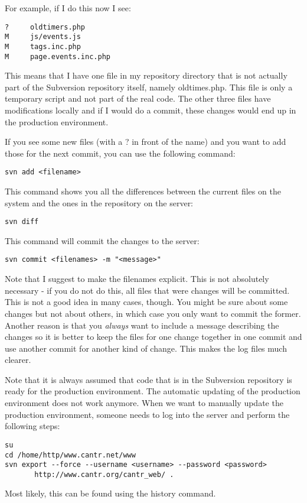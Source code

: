 \documentclass[a4paper,12pt]{article}
\begin{document}
For example, if I do this now I see:
\begin{verbatim}
?     oldtimers.php
M     js/events.js
M     tags.inc.php
M     page.events.inc.php
\end{verbatim}
This means that I have one file in my repository directory that is not actually part of the Subversion repository itself, namely oldtimes.php. This file is only a temporary script and not part of the real code. The other three files have modifications locally and if I would do a commit, these changes would end up in the production environment.

If you see some new files (with a ? in front of the name) and you want to add those for the next commit, you can use the following command:
\begin{verbatim}
svn add <filename>
\end{verbatim}

This command shows you all the differences between the current files on the system and the ones in the repository on the server:
\begin{verbatim}
svn diff
\end{verbatim}

This command will commit the changes to the server:
\begin{verbatim}
svn commit <filenames> -m "<message>"
\end{verbatim}
Note that I suggest to make the filenames explicit. This is not absolutely necessary - if you do not do this, all files that were changes will be committed. This is not a good idea in many cases, though. You might be sure about some changes but not about others, in which case you only want to commit the former. Another reason is that you {\it always} want to include a message describing the changes so it is better to keep the files for one change together in one commit and use another commit for another kind of change. This makes the log files much clearer.

Note that it is always assumed that code that is in the Subversion repository is ready for the production environment. The automatic updating of the production environment does not work anymore. When we want to manually update the production environment, someone needs to log into the server and perform the following steps:
\begin{verbatim}
su
cd /home/http/www.cantr.net/www
svn export --force --username <username> --password <password>
       http://www.cantr.org/cantr_web/ .
\end{verbatim}
Most likely, this can be found using the history command.
\end{document}
